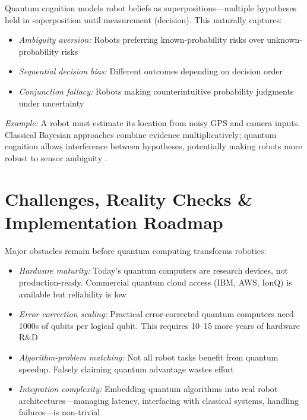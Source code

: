 \documentclass[conference]{IEEEtran}
\begin{document}
Quantum cognition models robot beliefs as superpositions---multiple hypotheses held in superposition until measurement (decision). This naturally captures:

\begin{itemize}
\item \textit{Ambiguity aversion:} Robots preferring known-probability risks over unknown-probability risks \cite{b51, b52}
\item \textit{Sequential decision bias:} Different outcomes depending on decision order \cite{b50, b53}
\item \textit{Conjunction fallacy:} Robots making counterintuitive probability judgments under uncertainty \cite{b54, b55}
\end{itemize}

\textit{Example:} A robot must estimate its location from noisy GPS and camera inputs. Classical Bayesian approaches combine evidence multiplicatively; quantum cognition allows interference between hypotheses, potentially making robots more robust to sensor ambiguity \cite{b1, b56, b57}.

\section{Challenges, Reality Checks \& Implementation Roadmap}

Major obstacles remain before quantum computing transforms robotics:

\begin{itemize}
\item \textit{Hardware maturity:} Today's quantum computers are research devices, not production-ready. Commercial quantum cloud access (IBM, AWS, IonQ) is available but reliability is low \cite{b9, b10, b11}

\item \textit{Error correction scaling:} Practical error-corrected quantum computers need 1000s of qubits per logical qubit. This requires 10--15 more years of hardware R\&D \cite{b13, b14}

\item \textit{Algorithm-problem matching:} Not all robot tasks benefit from quantum speedup. Falsely claiming quantum advantage wastes effort \cite{b58, b59, b60}

\item \textit{Integration complexity:} Embedding quantum algorithms into real robot architectures---managing latency, interfacing with classical systems, handling failures---is non-trivial
\end{itemize}
\end{document}

